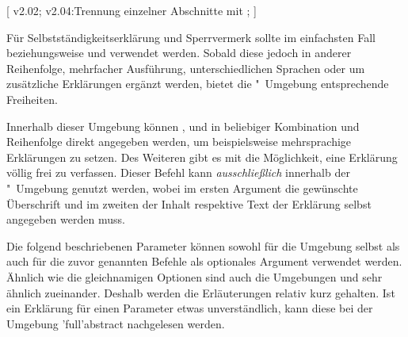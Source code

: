 \begin{DeclareEntity*}{}
\begin{DeclareEntity*}{}
\begin{DeclareEntity*}{}
\begin{Declaration}
  {}
  [
    v2.02;
    v2.04:Trennung einzelner Abschnitte mit ;
  ]
\begin{Declaration}
  {}
\begin{Declaration}
  {}
\begin{Declaration}
  {}
\begin{Declaration}
  {}
\begin{Declaration}
  {}
\begin{Declaration}
  {}
\begin{Declaration}
  {}
\begin{Declaration}
  {}
\begin{Declaration}
  {}
\begin{Declaration}
  {}
\printdeclarationlist
%
Für Selbstständigkeitserklärung und Sperrvermerk sollte im einfachsten Fall 
 beziehungsweise  und  
verwendet werden. Sobald diese jedoch in anderer Reihenfolge, mehrfacher 
Ausführung, unterschiedlichen Sprachen oder um zusätzliche Erklärungen ergänzt 
werden, bietet die "~Umgebung entsprechende 
Freiheiten.

Innerhalb dieser Umgebung können ,  und 
 in beliebiger Kombination und Reihenfolge direkt angegeben 
werden, um beispielsweise mehrsprachige Erklärungen zu setzen.
%
Des Weiteren gibt es mit  die Möglichkeit, eine 
Erklärung völlig frei zu verfassen. Dieser Befehl kann \emph{ausschließlich} 
innerhalb der "~Umgebung genutzt werden, wobei im 
ersten Argument die gewünschte Überschrift und im zweiten der Inhalt respektive 
Text der Erklärung selbst angegeben werden muss.

Die folgend beschriebenen Parameter können sowohl für die Umgebung 
 selbst als auch für die zuvor genannten Befehle als 
optionales Argument verwendet werden. Ähnlich wie die gleichnamigen Optionen 
sind auch die Umgebungen  und  
sehr ähnlich zueinander. Deshalb werden die Erläuterungen relativ kurz 
gehalten. Ist ein Erklärung für einen Parameter etwas unverständlich, kann 
diese bei der Umgebung \Environment'full'{abstract} nachgelesen werden.


\end{Declaration}
\end{Declaration}
\end{Declaration}
\end{Declaration}
\end{Declaration}
\end{Declaration}
\end{Declaration}
\end{Declaration}
\end{Declaration}
\end{Declaration}
\end{Declaration}
\end{DeclareEntity*}
\end{DeclareEntity*}
\end{DeclareEntity*}
